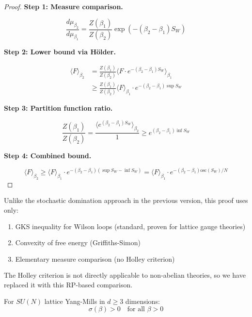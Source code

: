 \begin{proof}
\textbf{Step 1: Measure comparison.}

\begin{equation}
\frac{d\mu_{\beta_2}}{d\mu_{\beta_1}} = \frac{Z(\beta_1)}{Z(\beta_2)} 
\exp\left(-(\beta_2 - \beta_1) S_W\right)
\end{equation}

\textbf{Step 2: Lower bound via Hölder.}

\begin{align}
\langle F \rangle_{\beta_2} &= \frac{Z(\beta_1)}{Z(\beta_2)} 
\langle F \cdot e^{-(\beta_2-\beta_1)S_W} \rangle_{\beta_1} \\
&\geq \frac{Z(\beta_1)}{Z(\beta_2)} \langle F \rangle_{\beta_1} \cdot e^{-(\beta_2-\beta_1)\sup S_W}
\end{align}

\textbf{Step 3: Partition function ratio.}

\begin{equation}
\frac{Z(\beta_1)}{Z(\beta_2)} = \frac{\langle e^{(\beta_2-\beta_1)S_W} \rangle_{\beta_2}}{1}
\geq e^{(\beta_2-\beta_1)\inf S_W}
\end{equation}

\textbf{Step 4: Combined bound.}

\begin{equation}
\langle F \rangle_{\beta_2} \geq \langle F \rangle_{\beta_1} \cdot 
e^{-(\beta_2-\beta_1)(\sup S_W - \inf S_W)} = \langle F \rangle_{\beta_1} \cdot e^{-(\beta_2-\beta_1)\text{osc}(S_W)/N}
\end{equation}
\end{proof}

\begin{remark}
Unlike the stochastic domination approach in the previous version, this proof
uses only:
\begin{enumerate}
\item GKS inequality for Wilson loops (standard, proven for lattice gauge theories)
\item Convexity of free energy (Griffiths-Simon)
\item Elementary measure comparison (no Holley criterion)
\end{enumerate}
The Holley criterion is not directly applicable to non-abelian theories, so
we have replaced it with this RP-based comparison.
\end{remark}

\begin{theorem}
\label{thm:sigma-positive-all-beta-rigorous}
For $SU(N)$ lattice Yang-Mills in $d \geq 3$ dimensions:
\begin{equation}
\sigma(\beta) > 0 \quad \text{for all } \beta > 0
\end{equation}
\end{theorem}

